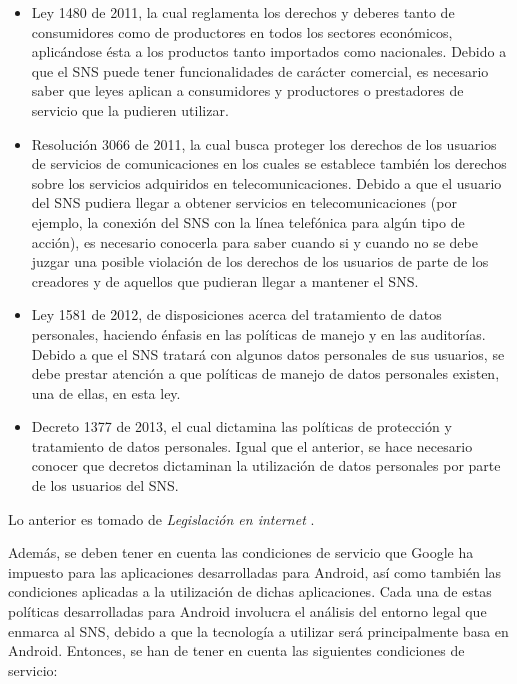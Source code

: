\begin{itemize}
  \item Ley 1480 de 2011, la cual reglamenta los derechos y deberes tanto de consumidores como de productores en todos los sectores económicos, aplicándose ésta a los productos tanto importados como nacionales. Debido a que el SNS puede tener funcionalidades de carácter comercial, es necesario saber que leyes aplican a consumidores y productores o prestadores de servicio que la pudieren utilizar.
  \item Resolución 3066 de 2011, la cual busca proteger los derechos de los usuarios de servicios de comunicaciones en los cuales se establece también los derechos sobre los servicios adquiridos en telecomunicaciones. Debido a que el usuario del SNS pudiera llegar a obtener servicios en telecomunicaciones (por ejemplo, la conexión del SNS con la línea telefónica para algún tipo de acción), es necesario conocerla para saber cuando si y cuando no se debe juzgar una posible violación de los derechos de los usuarios de parte de los creadores y de aquellos que pudieran llegar a mantener el SNS.
  \item Ley 1581 de 2012, de disposiciones acerca del tratamiento de datos personales, haciendo énfasis en las políticas de manejo y en las auditorías. Debido a que el SNS tratará con algunos datos personales de sus usuarios, se debe prestar atención a que políticas de manejo de datos personales existen, una de ellas, en esta ley.
  \item Decreto 1377 de 2013, el cual dictamina las políticas de protección y tratamiento de datos personales. Igual que el anterior, se hace necesario conocer que decretos dictaminan la utilización de datos personales por parte de los usuarios del SNS.
\end{itemize}

Lo anterior es tomado de \textit{Legislación en internet} \cite{leg_int}.

Además, se deben tener en cuenta las condiciones de servicio que Google ha impuesto para las aplicaciones desarrolladas para Android, así como también las condiciones aplicadas a la utilización de dichas aplicaciones. Cada una de estas políticas desarrolladas para Android involucra el análisis del entorno legal que enmarca al SNS, debido a que la tecnología a utilizar será principalmente basa en Android. Entonces, se han de tener en cuenta las siguientes condiciones de servicio:

